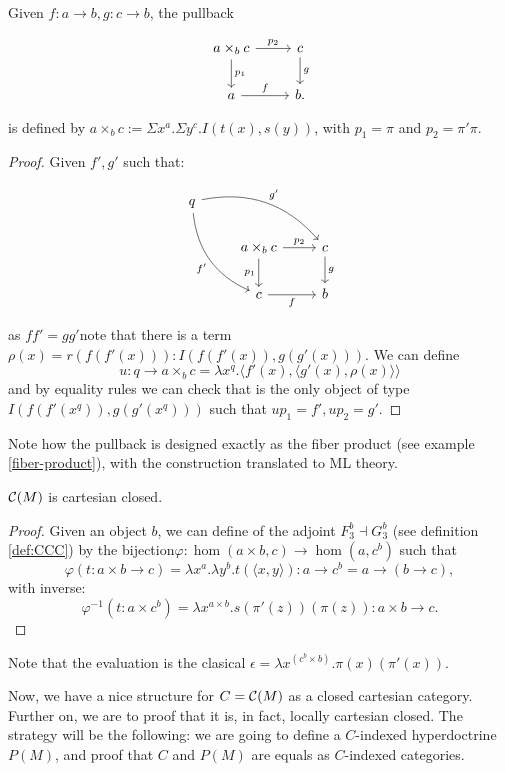 \begin{proposition}
  Given $f:a\to b, g:c\to b$, the pullback
  \[
    \begin{tikzpicture}
      \node {\begin{tikzcd}
          a\times_b c \ar[d,"p_1"]\ar[r,"p_2"] & c\ar[d,"g"]\\
          a\ar[r,"f"] &   b.
        \end{tikzcd}};
    \end{tikzpicture}
  \]
  is defined by $a\times_b c := \Sigma x^a. \Sigma y^c. I(t(x),s(y))$, with $p_1=\pi$ and $p_2=\pi'\pi$.
\end{proposition}
\begin{proof}
  Given $f',g'$ such that:

  
  \[
    \begin{tikzcd}
      q
      \arrow[bend left]{drr}{g'}
      \arrow[bend right,swap]{ddr}{f'} & & \\
      & a\times_{b}c \arrow{r}{p_2} \arrow{d}[swap]{p_1} & c \arrow{d}{g} \\
      & c \arrow[swap]{r}{f}   & b
    \end{tikzcd}
  \]

  as $ff' = gg'$note that there is a term $\rho(x) = r(f(f'(x))) : I(f(f'(x)), g(g'(x)))$. We can define $$u: q\to a\times_b c = \lambda x^q. \langle f'(x),\langle g'(x),\rho(x)\rangle\rangle$$
  and by equality rules we can check that is the only object of type $I(f(f'(x^q)), g(g'(x^q)))$ such that $up_1 = f',up_2=g'$.
\end{proof}
\begin{remark}
  Note how the pullback is designed exactly as the fiber product (see example \ref{fiber-product}), with the construction translated to ML theory.
\end{remark}

\begin{proposition}\label{prop:CM2}
  $\mathcal{C}(M)$ is cartesian closed.
\end{proposition}
\begin{proof}
  Given an object $b$, we can define of the adjoint $F_3^b\dashv G_3^b$ (see definition \ref{def:CCC}) by the bijection$\varphi: \hom(a\times b, c) \to \hom(a, c^b)$ such that
  $$\varphi(t:a\times b\to c) = \lambda x^a.\lambda y^b. t(\langle x,y\rangle) : a\to c^b = a\to (b\to c),$$
  with inverse:
  $$\varphi^{-1}(t:a\times c^b) = \lambda x^{a\times b}. s(\pi'(z))(\pi(z)) : a\times b\to c.$$
\end{proof}
\begin{remark}
  Note that the evaluation is the clasical $\epsilon  = \lambda x^{(c^b\times b)}.\pi(x)(\pi'(x))$.
\end{remark}
Now, we have a nice structure for $C=\mathcal{C}(M)$ as a closed cartesian category. Further on, we are to proof that it is, in fact, locally cartesian closed.  The strategy will be the following:  we are going to define a $C$-indexed hyperdoctrine $P(M)$, and proof that $C$ and $P(M)$ are equals as $C$-indexed categories.

